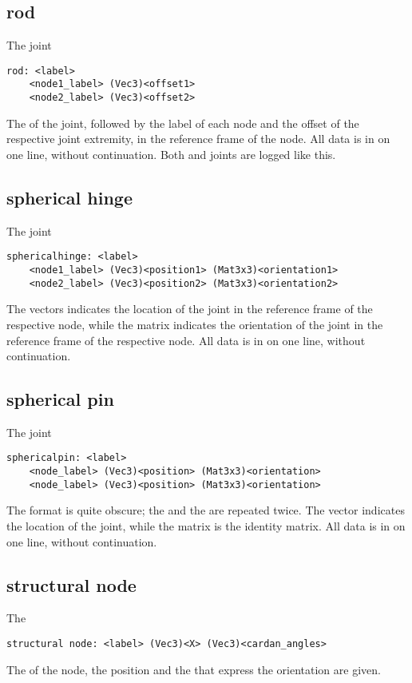 \subsection{rod}
The  joint
\begin{verbatim}
rod: <label>
    <node1_label> (Vec3)<offset1>
    <node2_label> (Vec3)<offset2>
\end{verbatim}
The  of the joint, followed by the label of each node
and the offset of the respective joint extremity,
in the reference frame of the node.
All data is in on one line, without continuation.
Both  and  joints are logged
like this.

\subsection{spherical hinge}
The  joint
\begin{verbatim}
sphericalhinge: <label>
    <node1_label> (Vec3)<position1> (Mat3x3)<orientation1>
    <node2_label> (Vec3)<position2> (Mat3x3)<orientation2>
\end{verbatim}
The  vectors indicates the location of the joint
in the reference frame of the respective node,
while the matrix  indicates the orientation of the joint
in the reference frame of the respective node.
All data is in on one line, without continuation.

\subsection{spherical pin}
The  joint
\begin{verbatim}
sphericalpin: <label>
    <node_label> (Vec3)<position> (Mat3x3)<orientation>
    <node_label> (Vec3)<position> (Mat3x3)<orientation>
\end{verbatim}
The format is quite obscure; the  and the 
are repeated twice.
The vector  indicates the location of the joint,
while the matrix  is the identity matrix.
All data is in on one line, without continuation.

\subsection{structural node}
The 
\begin{verbatim}
structural node: <label> (Vec3)<X> (Vec3)<cardan_angles>
\end{verbatim}
The  of the node, the position 
and the  that express the orientation
are given.

